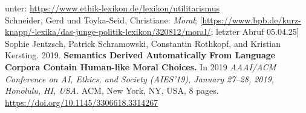 unter: \href{https://www.ethik-lexikon.de/lexikon/utilitarismus}{https://www.ethik-lexikon.de/lexikon/utilitarismus} \\
\newline
Schneider, Gerd und Toyka-Seid, Christiane:
\textit{Moral};
[\href{https://www.bpb.de/kurz-knapp/lexika/das-junge-politik-lexikon/320812/moral/}{https://www.bpb.de/kurz-knapp/-lexika/das-junge-politik-lexikon/320812/moral/};
letzter Abruf 05.04.25] \\
\newline
Sophie Jentzsch, Patrick Schramowski, Constantin Rothkopf, and Kristian
Kersting. 2019.
\textbf{Semantics Derived Automatically From Language Corpora
Contain Human-like Moral Choices.}
In 2019 \textit{AAAI/ACM Conference on AI,
Ethics, and Society (AIES’19), January 27–28, 2019, Honolulu, HI, USA.} ACM,
New York, NY, USA, 8 pages. \\
\href{https://doi.org/10.1145/3306618.3314267}{https://doi.org/10.1145/3306618.3314267}







